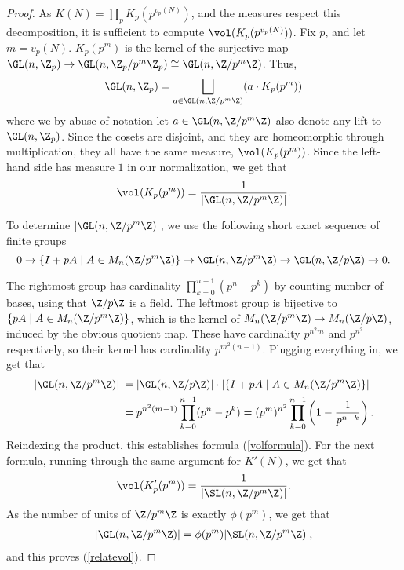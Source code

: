 \begin{proof}
As $K(N) = \prod_p K_p(p^{v_p(N)})$, and the measures respect this decomposition, it is sufficient to compute $\vol(K_p(p^{v_p(N)}))$. Fix $p$, and let $m=v_p(N)$. $K_p(p^m)$ is the kernel of the surjective map $\GL(n,\Z_p)\to\GL(n,\Z_p/p^m\Z_p)\cong \GL(n,\Z/p^m\Z)$. Thus,
$$\GL(n,\Z_p)=\bigsqcup_{a\in\GL(n,\Z/p^m\Z)}(a\cdot K_p(p^m))$$
where we by abuse of notation let $a\in\GL(n,\Z/p^m\Z)$ also denote any lift to $\GL(n,\Z_p)$. Since the cosets are disjoint, and they are homeomorphic through multiplication, they all have the same measure, $\vol(K_p(p^m))$. Since the left-hand side has measure $1$ in our normalization, we get that 
$$\vol(K_p(p^m))=\frac{1}{|\GL(n,\Z/p^m\Z)|}.$$

\noindent To determine $|\GL(n,\Z/p^m\Z)|$, we use the following short exact sequence of finite groups
$$0\to\lbrace I+pA\mid A\in M_n(\Z/p^m\Z)\rbrace\to \GL(n,\Z/p^m\Z)\to \GL(n,\Z/p\Z)\to 0.$$

\noindent The rightmost group has cardinality $\prod_{k=0}^{n-1}(p^n-p^k)$ by counting number of bases, using that $\Z/p\Z$ is a field. The leftmost group is bijective to $\lbrace pA\mid A\in M_n(\Z/p^m\Z)\rbrace$, which is the kernel of $M_n(\Z/p^m\Z)\to M_n(\Z/p\Z)$, induced by the obvious quotient map. These have cardinality $p^{n^2m}$ and $p^{n^2}$ respectively, so their kernel has cardinality $p^{m^2(n-1)}$. Plugging everything in, we get that
\begin{align}\label{localvol}
 |\GL(n,\Z/p^m\Z)|\:&= |\GL(n,\Z/p\Z)|\cdot |\lbrace I+pA\mid A\in M_n(\Z/p^m\Z)\rbrace| \\
&= p^{n^2(m-1)}\prod_{k=0}^{n-1}(p^n-p^k) = (p^{m})^{n^2}\prod_{k=0}^{n-1}\left(1-\frac{1}{p^{n-k}}\right).
\end{align}
Reindexing the product, this establishes formula (\ref{volformula}). For the next formula, running through the same argument for $K'(N)$, we get that
\begin{align}\label{SLnlocalvol}
    \vol(K_p'(p^{m})) = \frac{1}{|\SL(n,\Z/p^m\Z)|}.
\end{align}
As the number of units of $\Z/p^m\Z$ is exactly $\phi(p^m)$, we get that 
\begin{align*}
    |\GL(n,\Z/p^m\Z)| = \phi(p^m) |\SL(n,\Z/p^m\Z)|,
\end{align*}
and this proves (\ref{relatevol}). 


\end{proof}
